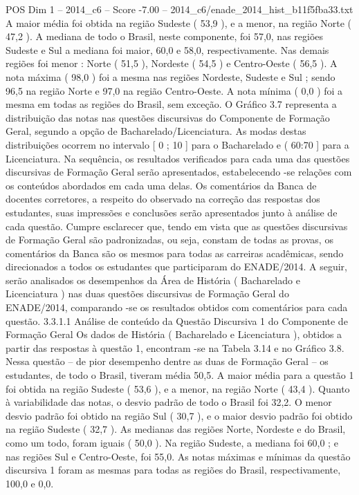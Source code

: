 \begin{textsample}{POS Dim 1 – 2014\_c6 – Score -7.00 – 2014\_c6/enade\_2014\_hist\_b11f5fba33.txt}
A maior média foi obtida na região Sudeste ( 53,9 ), e a menor, na região Norte ( 47,2 ).
A mediana de todo o Brasil, neste componente, foi 57,0, nas regiões Sudeste e Sul a mediana foi maior, 60,0 e 58,0, respectivamente.
Nas demais regiões foi menor : Norte ( 51,5 ), Nordeste ( 54,5 ) e Centro-Oeste ( 56,5 ).
A nota máxima ( 98,0 ) foi a mesma nas regiões Nordeste, Sudeste e Sul ; sendo 96,5 na região Norte e 97,0 na região Centro-Oeste.
A nota mínima ( 0,0 ) foi a mesma em todas as regiões do Brasil, sem exceção.
O Gráfico 3.7 representa a distribuição das notas nas questões discursivas do Componente de Formação Geral, segundo a opção de Bacharelado/Licenciatura.
As modas destas distribuições ocorrem no intervalo [ 0 ; 10 ] para o Bacharelado e ( 60:70 ] para a Licenciatura.
Na sequência, os resultados verificados para cada uma das questões discursivas de Formação Geral serão apresentados, estabelecendo -se relações com os conteúdos abordados em cada uma delas.
Os comentários da Banca de docentes corretores, a respeito do observado na correção das respostas dos estudantes, suas impressões e conclusões serão apresentados junto à análise de cada questão.
Cumpre esclarecer que, tendo em vista que as questões discursivas de Formação Geral são padronizadas, ou seja, constam de todas as provas, os comentários da Banca são os mesmos para todas as carreiras acadêmicas, sendo direcionados a todos os estudantes que participaram do ENADE/2014.
A seguir, serão analisados os desempenhos da Área de História ( Bacharelado e Licenciatura ) nas duas questões discursivas de Formação Geral do ENADE/2014, comparando -se os resultados obtidos com comentários para cada questão. 3.3.1.1 Análise de conteúdo da Questão Discursiva 1 do Componente de Formação Geral Os dados de História ( Bacharelado e Licenciatura ), obtidos a partir das respostas à questão 1, encontram -se na Tabela 3.14 e no Gráfico 3.8.
Nessa questão – de pior desempenho dentre as duas de Formação Geral – os estudantes, de todo o Brasil, tiveram média 50,5.
A maior média para a questão 1 foi obtida na região Sudeste ( 53,6 ), e a menor, na região Norte ( 43,4 ).
Quanto à variabilidade das notas, o desvio padrão de todo o Brasil foi 32,2.
O menor desvio padrão foi obtido na região Sul ( 30,7 ), e o maior desvio padrão foi obtido na região Sudeste ( 32,7 ).
As medianas das regiões Norte, Nordeste e do Brasil, como um todo, foram iguais ( 50,0 ).
Na região Sudeste, a mediana foi 60,0 ; e nas regiões Sul e Centro-Oeste, foi 55,0.
As notas máximas e mínimas da questão discursiva 1 foram as mesmas para todas as regiões do Brasil, respectivamente, 100,0 e 0,0.

\end{textsample}
